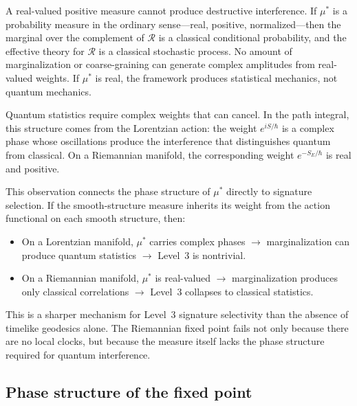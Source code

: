 \documentclass[12pt,a4paper]{article}
\theoremstyle{definition}
\theoremstyle{remark}
\begin{document}
A real-valued positive measure cannot produce destructive interference.
If $\mu^*$ is a probability measure in the ordinary sense---real,
positive, normalized---then the marginal over the complement of
$\mathcal{R}$ is a classical conditional probability, and the effective
theory for $\mathcal{R}$ is a classical stochastic process. No amount
of marginalization or coarse-graining can generate complex amplitudes
from real-valued weights. If $\mu^*$ is real, the framework produces
statistical mechanics, not quantum mechanics.

Quantum statistics require complex weights that can cancel. In the path
integral, this structure comes from the Lorentzian action: the weight
$e^{iS/\hbar}$ is a complex phase whose oscillations produce the
interference that distinguishes quantum from classical. On a Riemannian
manifold, the corresponding weight $e^{-S_E/\hbar}$ is real and positive.

This observation connects the phase structure of $\mu^*$ directly to
signature selection. If the smooth-structure measure inherits its weight
from the action functional on each smooth structure, then:
\begin{itemize}
\item On a Lorentzian manifold, $\mu^*$ carries complex phases $\to$
marginalization can produce quantum statistics $\to$ Level~3 is
nontrivial.
\item On a Riemannian manifold, $\mu^*$ is real-valued $\to$
marginalization produces only classical correlations $\to$ Level~3
collapses to classical statistics.
\end{itemize}
This is a sharper mechanism for Level~3 signature selectivity than the
absence of timelike geodesics alone. The Riemannian fixed point fails
not only because there are no local clocks, but because the measure
itself lacks the phase structure required for quantum interference.

\subsection{Phase structure of the fixed point}
\label{sec:phase_structure}
\end{document}
